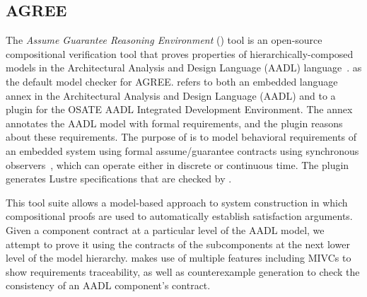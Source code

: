 \subsection{AGREE}

The {\em Assume Guarantee Reasoning Environment} (\agree) tool is
an open-source compositional verification tool that proves properties
of hierarchically-composed models in the Architectural Analysis and
Design Language (AADL) language~\cite{NFM2012:CoGaMiWhLaLu,QFCS15:backes,hilt2013}.
\jkind as the default model checker for AGREE.  \agree
refers to both an embedded language annex in the Architectural
Analysis and Design Language (AADL) and to a plugin for the OSATE AADL
Integrated Development Environment. The \agree annex annotates the
AADL model with formal requirements, and the plugin reasons about
these requirements. The purpose of \agree is to model behavioral
requirements of an embedded system using formal assume/guarantee
contracts using synchronous observers~\cite{Halbwachs91:lustre}, which can operate either in discrete or continuous time. The plugin generates Lustre specifications that are checked by \jkind.


This tool suite allows a model-based approach to system construction in which compositional proofs are used to automatically establish satisfaction arguments.
Given a component contract at a particular level of the AADL model, we attempt to prove it using the contracts of the subcomponents at the next lower level of the model hierarchy.
\agree makes use of multiple \jkind features including MIVCs to show requirements traceability, as well as counterexample generation to check the consistency of an AADL
component's contract.



%

